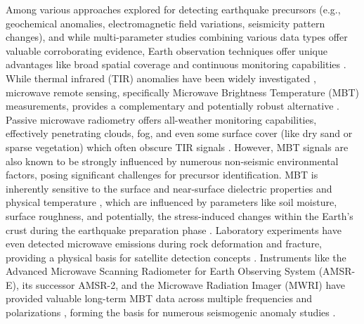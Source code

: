 \documentclass[fleqn,10pt]{wlscirep_mdpi_style}
\begin{document}
Among various approaches explored for detecting earthquake precursors (e.g., geochemical anomalies, electromagnetic field variations, seismicity pattern changes), and while multi-parameter studies combining various data types offer valuable corroborating evidence, Earth observation techniques offer unique advantages like broad spatial coverage and continuous monitoring capabilities \cite{pulinetsLithosphereAtmosphereIonosphere2011,wuGEOSSbasedThermalParameters2012}. While thermal infrared (TIR) anomalies have been widely investigated \cite{akhoondzadehMultiPrecursorsAnalysis2018}, microwave remote sensing, specifically Microwave Brightness Temperature (MBT) measurements, provides a complementary and potentially robust alternative \cite{wuGEOSSbasedThermalParameters2012}. Passive microwave radiometry offers all-weather monitoring capabilities, effectively penetrating clouds, fog, and even some surface cover (like dry sand or sparse vegetation) which often obscure TIR signals \cite{carverMicrowaveRemoteSensing1985,hersbachERA5GlobalReanalysis2020,kawanishiAdvancedMicrowaveScanning2003}. However, MBT signals are also known to be strongly influenced by numerous non-seismic environmental factors, posing significant challenges for precursor identification. MBT is inherently sensitive to the surface and near-surface dielectric properties and physical temperature \cite{carverMicrowaveRemoteSensing1985,njokuRetrievalLandSurface1999}, which are influenced by parameters like soil moisture, surface roughness, and potentially, the stress-induced changes within the Earth's crust during the earthquake preparation phase \cite{freundTimeresolvedStudyCharge,jingChangesSurfaceWater2022,maoImpactCompressiveStress2020,qiSpatiotemporallyWeightedTwostep2020,takanoExperimentTheoreticalStudy2009}. Laboratory experiments have even detected microwave emissions during rock deformation and fracture, providing a physical basis for satellite detection concepts \cite{takanoExperimentTheoreticalStudy2009,keijiimaokaStatusAMSR2Instrument2012,liuExperimentalStudyMicrowave2016}. Instruments like the Advanced Microwave Scanning Radiometer for Earth Observing System (AMSR-E), its successor AMSR-2, and the Microwave Radiation Imager (MWRI) have provided valuable long-term MBT data across multiple frequencies and polarizations \cite{kawanishiAdvancedMicrowaveScanning2003,qiSpatiotemporallyWeightedTwostep2020,guptaMicrowaveEmissionScattering2014,maedaDiscriminationLocalFaint2008,qiMicrowaveBrightnessTemperature2022}, forming the basis for numerous seismogenic anomaly studies \cite{wuGEOSSbasedThermalParameters2012,qiSpatiotemporallyWeightedTwostep2020,qiMicrowaveBrightnessTemperature2022,jingPassiveMicrowaveResponse2018,maTwostepMethodExtract2011,qiCharacteristicBackgroundMicrowave2023,wuIdentifyingSeismicAnomalies2024,lixinProgressesPossibleFrontiers2022}.
\end{document}
